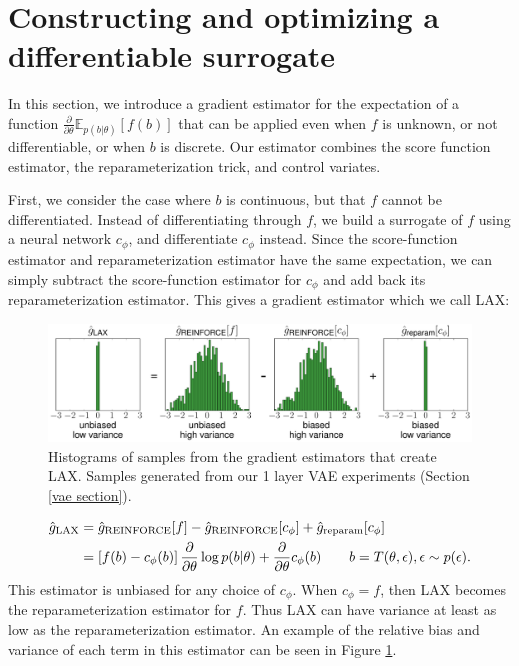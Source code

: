 \documentclass{article}
\newcommand{\E}{\mathbb{E}}
\newcommand{\PT}{\frac{\partial}{\partial \theta}}
\newcommand{\LAX}{{\textnormal{LAX}}}
\begin{document}
\section{Constructing and optimizing a differentiable surrogate}
\label{lax section}
In this section, we introduce a gradient estimator for the expectation of a function $\PT \E_{p(b|\theta)}[f(b)]$ that can be applied even when $f$ is unknown, or not differentiable, or when $b$ is discrete.
Our estimator combines the score function estimator, the reparameterization trick, and control variates.

First, we consider the case where $b$ is continuous, but that $f$ cannot be differentiated.
Instead of differentiating through $f$, we build a surrogate of $f$ using a neural network $c_\phi$, and differentiate $c_\phi$ instead.
Since the score-function estimator and reparameterization estimator have the same expectation,
we can simply subtract the score-function estimator for $c_\phi$ and add back its reparameterization estimator.
This gives a gradient estimator which we call LAX:
\begin{figure}[b]
\includegraphics[width=\columnwidth]{figures/grad_hist.pdf}
\caption{Histograms of samples from the gradient estimators that create LAX. Samples generated from our 1 layer VAE experiments (Section \ref{vae section}).}
\label{fig:grad hist}
\end{figure}
%
\begin{align}
\label{eq:cont_est}
\hat g_\LAX &= 
\hat{g}_\textnormal{REINFORCE}[f] - \hat{g}_\textnormal{REINFORCE}[c_\phi] + \hat{g}_\textnormal{reparam}[c_\phi] \nonumber\\
&= \left[ f(b) -c_\phi(b) \right] \PT \log p(b|\theta) + \PT c_\phi(b) \qquad b = T(\theta, \epsilon), \epsilon \sim p(\epsilon).
\end{align}
%
This estimator is unbiased for any choice of $c_\phi$.
When $c_\phi = f$, then \LAX{} becomes the reparameterization estimator for $f$.
Thus \LAX{} can have variance at least as low as the reparameterization estimator. An example of the relative bias and variance of each term in this estimator can be seen in Figure \ref{fig:grad hist}.
\end{document}
